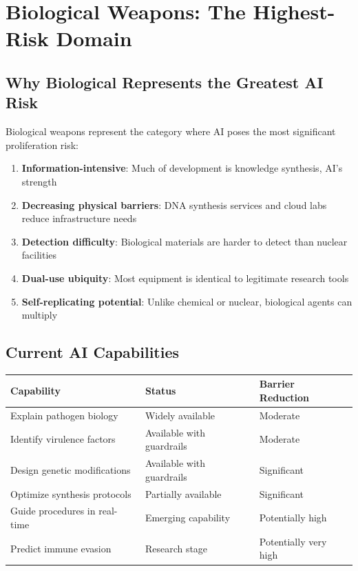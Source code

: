 \documentclass[11pt,letterpaper]{article}
\begin{document}
\section{Biological Weapons: The Highest-Risk Domain}

\subsection{Why Biological Represents the Greatest AI Risk}

Biological weapons represent the category where AI poses the most significant proliferation risk:

\begin{enumerate}
  \item \textbf{Information-intensive}: Much of development is knowledge synthesis, AI's strength
  \item \textbf{Decreasing physical barriers}: DNA synthesis services and cloud labs reduce infrastructure needs
  \item \textbf{Detection difficulty}: Biological materials are harder to detect than nuclear facilities
  \item \textbf{Dual-use ubiquity}: Most equipment is identical to legitimate research tools
  \item \textbf{Self-replicating potential}: Unlike chemical or nuclear, biological agents can multiply
\end{enumerate}

\subsection{Current AI Capabilities}

\begin{center}
\small
\begin{tabular}{L{4.5cm}L{3.5cm}L{4cm}}
\toprule
\textbf{Capability} & \textbf{Status} & \textbf{Barrier Reduction} \\
\midrule
Explain pathogen biology & Widely available & Moderate \\
Identify virulence factors & Available with guardrails & Moderate \\
Design genetic modifications & Available with guardrails & Significant \\
Optimize synthesis protocols & Partially available & Significant \\
Guide procedures in real-time & Emerging capability & Potentially high \\
Predict immune evasion & Research stage & Potentially very high \\
\bottomrule
\end{tabular}
\end{center}
\end{document}
